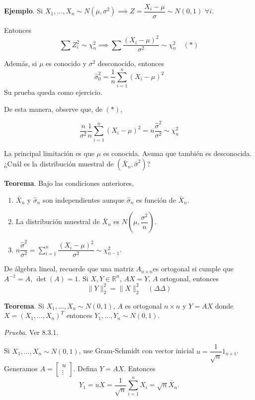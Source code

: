 \documentclass[
  12pt,
]{book}
\begin{document}
\textbf{Ejemplo}. Si \(X_1,\dots,X_n \sim N(\mu,\sigma^2) \implies Z = \dfrac{X_i-\mu}{\sigma} \sim N(0,1)\) \(\forall i\).

Entonces
\[\sum Z_i^2 \sim \chi^2_n \implies \sum \dfrac{(X_i-\mu)^2}{\sigma^2}\sim \chi^2_n \quad (*) \]

Además, si \(\mu\) es conocido y \(\sigma^2\) desconocido, entonces
\[\hat\sigma_0^2=\dfrac{1}n \sum_{i=1}^n(X_i-\mu)^2\]
Su prueba queda como ejercicio.

De esta manera, observe que, de \((*)\),

\[\dfrac{n}{\sigma^2} \dfrac{1}n \sum_{i=1}^n(X_i-\mu)^2 = n\dfrac{\hat\sigma^2}{\sigma^2} \sim \chi^2_n \]

La principal limitación es que \(\mu\) es conocida. Asuma que también es desconocida. ¿Cuál es la distribución muestral de \((\bar X_n,\hat\sigma^2)\)?

\textbf{Teorema}. Bajo las condiciones anteriores,

\begin{enumerate}
\def\labelenumi{\arabic{enumi})}
\item
  \(\bar X_n\) y \(\hat \sigma_n\) son independientes aunque \(\hat \sigma_n\) es función de \(\bar X_n\).
\item
  La distribución muestral de \(\bar X_n\) es \(N\left(\mu,\dfrac{\sigma^2}{n}\right)\).
\item
  \(n\dfrac{\hat \sigma^2}{\sigma^2} =\sum_{i=1}^n \dfrac{(X_i-\mu)^2}{\sigma^2} \sim \chi^2_{n-1}\).
\end{enumerate}

De álgebra lineal, recuerde que una matriz \(A_{n\times n}\)es ortogonal si cumple que \(A^{-1} = A\), \(\det(A) = 1\). Si \(X, Y\in \mathbb R ^{n}\), \(AX =Y\), \(A\) ortogonal, entonces \[ \|Y\|_2^2 =  \|X\|_2^2 \quad (\Delta\Delta)\]

\textbf{Teorema}. Si \(X_1,\dots,X_n \sim N(0,1)\), \(A\) es ortogonal \(n\times n\) y \(Y=AX\) donde \(X = (X_1,\dots,X_n)^T\) entonces \(Y_1,\dots,Y_n \sim N(0,1)\).

\emph{Prueba}. Ver 8.3.1.

Si \(X_1,\dots,X_n \sim N(0,1)\), use Gram-Schmidt con vector inicial \(u = \dfrac 1{\sqrt n} 1_{n\times1}\).
Generamos \(A = \begin{bmatrix}u\\\vdots\end{bmatrix}\). Defina \(Y =AX\). Entonces
\[ Y_1 = uX = \dfrac 1{\sqrt{n}}\sum_{i=1}^n X_i = \sqrt{n} \bar X_n.\]
\end{document}

